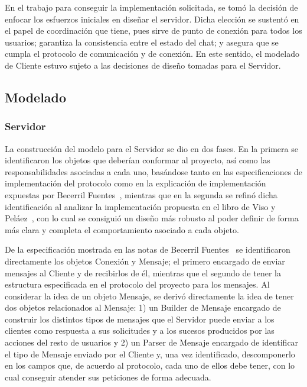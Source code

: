 \documentclass[11pt, a4paper]{article}
\begin{document}
En el trabajo para conseguir la implementación solicitada, se tomó la decisión de enfocar los esfuerzos iniciales en diseñar el servidor. Dicha elección se sustentó en el papel de coordinación que tiene, pues sirve de punto de conexión para todos los usuarios; garantiza la consistencia entre el estado del chat; y asegura que se cumpla el protocolo de comunicación y de conexión. En este sentido, el modelado de Cliente estuvo sujeto a las decisiones de diseño tomadas para el Servidor.

\subsection*{Modelado}

\subsubsection*{Servidor}

La construcción del modelo para el Servidor se dio en dos fases. En la primera se identificaron los objetos que deberían conformar al proyecto, así como las responsabilidades asociadas a cada uno, basándose tanto en las especificaciones de implementación del protocolo como en la explicación de implementación expuestas por Becerril Fuentes~\cite{becerril2019}, mientras que en la segunda se refinó dicha identificación al analizar la implementación propuesta en el libro de Viso y Peláez~\cite{viso2012}, con lo cual se consiguió un diseño más robusto al poder definir de forma más clara y completa el comportamiento asociado a cada objeto.

De la especificación mostrada en las notas de Becerril Fuentes~\cite{becerril2019} se identificaron directamente los objetos Conexión y Mensaje; el primero encargado de enviar mensajes al Cliente y de recibirlos de él, mientras que el segundo de tener la estructura especificada en el protocolo del proyecto para los mensajes. Al considerar la idea de un objeto Mensaje, se derivó directamente la idea de tener dos objetos relacionados al Mensaje: 1) un Builder de Mensaje encargado de construir los distintos tipos de mensajes que el Servidor puede enviar a los clientes como respuesta a sus solicitudes y a los sucesos producidos por las acciones del resto de usuarios y 2) un Parser de Mensaje encargado de identificar el tipo de Mensaje enviado por el Cliente y, una vez identificado, descomponerlo en los campos que, de acuerdo al protocolo, cada uno de ellos debe tener, con lo cual conseguir atender sus peticiones de forma adecuada.
\end{document}
